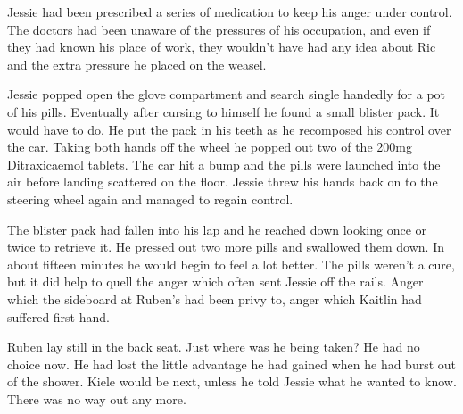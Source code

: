 Jessie had been prescribed a series of medication to keep his anger under control.  The doctors had been unaware of the pressures of his occupation, and even if they had known his place of work, they wouldn't have had any idea about Ric and the extra pressure he placed on the weasel.

Jessie popped open the glove compartment and search single handedly for a pot of his pills.  Eventually after cursing to himself he found a small blister pack.  It would have to do.  He put the pack in his teeth as he recomposed his control over the car.  Taking both hands off the wheel he popped out two of the 200mg Ditraxicaemol tablets.  The car hit a bump and the pills were launched into the air before landing scattered on the floor.  Jessie threw his hands back on to the steering wheel again and managed to regain control.

The blister pack had fallen into his lap and he reached down looking once or twice to retrieve it.  He pressed out two more pills and swallowed them down.  In about fifteen minutes he would begin to feel a lot better.  The pills weren't a cure, but it did help to quell the anger which often sent Jessie off the rails.  Anger which the sideboard at Ruben's had been privy to, anger which Kaitlin had suffered first hand.  

Ruben lay still in the back seat.  Just where was he being taken?  He had no choice now.  He had lost the little advantage he had gained when he had burst out of the shower.  Kiele would be next, unless he told Jessie what he wanted to know.  There was no way out any more.  


